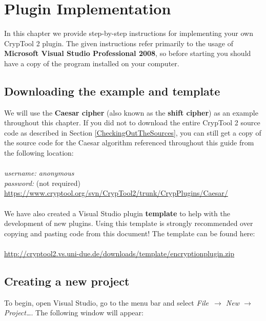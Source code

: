 \chapter{Plugin Implementation}
\label{sec:PluginImplementation}
In this chapter we provide step-by-step instructions for implementing your own CrypTool 2 plugin. The given instructions refer primarily to the usage of \textbf{Microsoft Visual Studio Professional 2008}, so before starting you should have a copy of the program installed on your computer. 

\section{Downloading the example and template}
\label{sec:DownloadingTheExampleAndTemplate}

We will use the \textbf{Caesar cipher} (also known as the \textbf{shift cipher}) as an example throughout this chapter. If you did not to download the entire CrypTool 2 source code as described in Section \ref{CheckingOutTheSources}, you can still get a copy of the source code for the Caesar algorithm referenced throughout this guide from the following location:\\\\
\textit{username: anonymous\\
password:} (not required)\\
\url{https://www.cryptool.org/svn/CrypTool2/trunk/CrypPlugins/Caesar/}\\\\
We have also created a Visual Studio plugin \textbf{template} to help with the development of new plugins. Using this template is strongly recommended over copying and pasting code from this document! The template can be found here:\\\\
\url{http://cryptool2.vs.uni-due.de/downloads/template/encryptionplugin.zip}

\section{Creating a new project}
\label{sec:CreatingANewProject}

To begin, open Visual Studio, go to the menu bar and select \textit{File~$\rightarrow$ New $\rightarrow$ Project\ldots }. The following window will appear:

